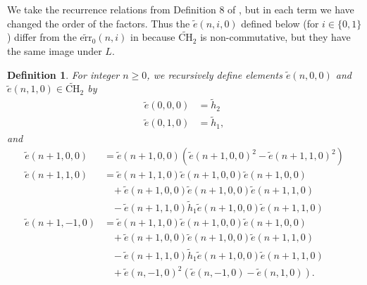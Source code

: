 \documentclass[11pt, oneside]{article}   	%
\newtheorem{definition}{Definition}
\newcommand{\err}{\mathrm{err}}
\newcommand{\mrm}[1]{\mathrm{#1}}
\newcommand{\te}{\tilde{e}}
\begin{document}
We take the recurrence relations from Definition 8 of \cite{DeFranco}, but in each term we have changed the order of the factors. Thus the $\tilde{e}(n,i,0)$ defined below  (for $i \in \{ 0,1\}$) differ from the $\tilde{\err}_0(n,i)$ in \cite{DeFranco} because $\tilde{\mathrm{CH}}_2$ is non-commutative, but they have the same image under $L$. 
\begin{definition} \label{d lc0 rec}
For integer $n \geq 0$, we recursively define elements $\te(n,0,0)$ and $\te(n,1,0) \in \tilde{\mrm{CH}}_2$ by 
\begin{align*}
\te(0,0,0) &= \tilde{h}_2\\ 
\te(0,1,0) &= \tilde{h}_1,
\end{align*}
and
\begin{align}
\te(n+1,0,0) &= \te(n+1,0,0) (\te(n+1,0,0)^2 - \te(n+1,1,0)^2)   \label{0 rec}\\ 
\te(n+1,1,0) &= \te(n+1,1,0)\te(n+1,0,0)\te(n+1,0,0)  \nonumber \\ 
&\,\,\,\,\,+\te(n+1,0,0)\te(n+1,0,0)\te(n+1,1,0) \\
&\,\,\,\,\,-\te(n+1,1,0) \tilde{h}_1\te(n+1,0,0)\te(n+1,1,0)\label{1 rec}\\ 
\te(n+1,-1,0) &= \te(n+1,1,0)\te(n+1,0,0)\te(n+1,0,0)  \nonumber \\ 
&\,\,\,\,\,+\te(n+1,0,0)\te(n+1,0,0)\te(n+1,1,0) \\
&\,\,\,\,\,-\te(n+1,1,0) \tilde{h}_1\te(n+1,0,0)\te(n+1,1,0)\\ 
&\,\,\,\,\,+ \te(n,-1,0)^2(\te(n,-1,0)-\te(n,1,0)).
\end{align}

\end{definition} 
\end{document}
